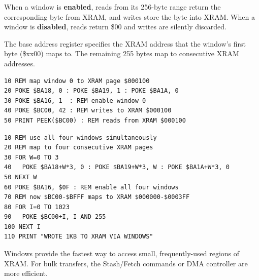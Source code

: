 When a window is \textbf{enabled}, reads from its 256-byte range return the
corresponding byte from XRAM, and writes store the byte into XRAM.  When a
window is \textbf{disabled}, reads return \$00 and writes are silently
discarded.

The base address register specifies the XRAM address that the window's
first byte (\$xx00) maps to.  The remaining 255 bytes map to consecutive
XRAM addresses.

\begin{lstlisting}
10 REM map window 0 to XRAM page $000100
20 POKE $BA18, 0 : POKE $BA19, 1 : POKE $BA1A, 0
30 POKE $BA16, 1  : REM enable window 0
40 POKE $BC00, 42 : REM writes to XRAM $000100
50 PRINT PEEK($BC00) : REM reads from XRAM $000100
\end{lstlisting}

\begin{lstlisting}
10 REM use all four windows simultaneously
20 REM map to four consecutive XRAM pages
30 FOR W=0 TO 3
40   POKE $BA18+W*3, 0 : POKE $BA19+W*3, W : POKE $BA1A+W*3, 0
50 NEXT W
60 POKE $BA16, $0F : REM enable all four windows
70 REM now $BC00-$BFFF maps to XRAM $000000-$0003FF
80 FOR I=0 TO 1023
90   POKE $BC00+I, I AND 255
100 NEXT I
110 PRINT "WROTE 1KB TO XRAM VIA WINDOWS"
\end{lstlisting}

\begin{notebox}
Windows provide the fastest way to access small, frequently-used regions
of XRAM.  For bulk transfers, the Stash/Fetch commands or DMA controller
are more efficient.
\end{notebox}
